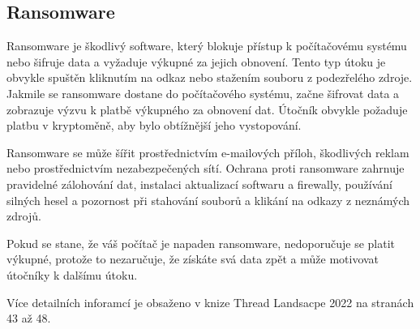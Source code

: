 \subsection{Ransomware}

Ransomware je škodlivý software, který blokuje přístup k počítačovému systému nebo šifruje data a vyžaduje výkupné za jejich obnovení. Tento typ útoku je obvykle spuštěn kliknutím na odkaz nebo stažením souboru z podezřelého zdroje. Jakmile se ransomware dostane do počítačového systému, začne šifrovat data a zobrazuje výzvu k platbě výkupného za obnovení dat. Útočník obvykle požaduje platbu v kryptoměně, aby bylo obtížnější jeho vystopování.

Ransomware se může šířit prostřednictvím e-mailových příloh, škodlivých reklam nebo prostřednictvím nezabezpečených sítí. Ochrana proti ransomware zahrnuje pravidelné zálohování dat, instalaci aktualizací softwaru a firewally, používání silných hesel a pozornost při stahování souborů a klikání na odkazy z neznámých zdrojů.

Pokud se stane, že váš počítač je napaden ransomware, nedoporučuje se platit výkupné, protože to nezaručuje, že získáte svá data zpět a může motivovat útočníky k dalšímu útoku.

Více detailních inforamcí je obsaženo v knize Thread Landsacpe 2022 na stranách 43 až 48. \cite{enisa}